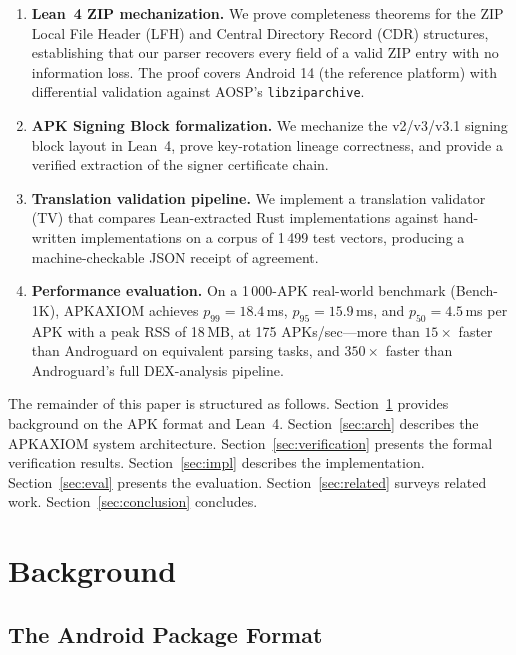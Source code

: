 \documentclass[runningheads]{llncs}
\begin{document}
\begin{enumerate}
\item \textbf{Lean~4 ZIP mechanization.}  We prove completeness theorems for
the ZIP Local File Header (LFH) and Central Directory Record (CDR) structures,
establishing that our parser recovers every field of a valid ZIP entry with no
information loss.  The proof covers Android 14 (the reference platform) with
differential validation against AOSP's \texttt{libziparchive}.

\item \textbf{APK Signing Block formalization.}  We mechanize the v2/v3/v3.1
signing block layout in Lean~4, prove key-rotation lineage correctness, and
provide a verified extraction of the signer certificate chain.

\item \textbf{Translation validation pipeline.}  We implement a translation
validator (TV) that compares Lean-extracted Rust implementations against
hand-written implementations on a corpus of 1\,499 test vectors, producing a
machine-checkable JSON receipt of agreement.

\item \textbf{Performance evaluation.}  On a 1\,000-APK real-world benchmark
(Bench-1K), APKAXIOM achieves $p_{99} = 18.4$\,ms, $p_{95} = 15.9$\,ms, and
$p_{50} = 4.5$\,ms per APK with a peak RSS of 18\,MB, at 175 APKs/sec—more
than $15\times$ faster than Androguard on equivalent parsing tasks, and
$350\times$ faster than Androguard's full DEX-analysis pipeline.
\end{enumerate}

The remainder of this paper is structured as follows.
Section~\ref{sec:background} provides background on the APK format and Lean~4.
Section~\ref{sec:arch} describes the APKAXIOM system architecture.
Section~\ref{sec:verification} presents the formal verification results.
Section~\ref{sec:impl} describes the implementation.
Section~\ref{sec:eval} presents the evaluation.
Section~\ref{sec:related} surveys related work.
Section~\ref{sec:conclusion} concludes.

\section{Background}
\label{sec:background}

\subsection{The Android Package Format}
\end{document}
